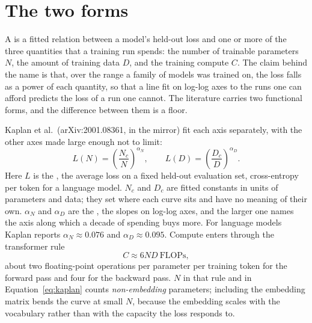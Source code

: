 
\section{The two forms}
\label{sec:forms}

A  is a fitted relation between a model's held-out loss and one
or more of the three quantities that a training run spends: the number of trainable
parameters $N$, the amount of training data $D$, and the training compute $C$. The
claim behind the name is that, over the range a family of models was trained on,
the loss falls as a power of each quantity, so that a line fit on log-log axes to
the runs one can afford predicts the loss of a run one cannot. The literature
carries two functional forms, and the difference between them is a floor.

Kaplan et al.\ (arXiv:2001.08361, in the mirror) fit each axis separately, with the other axes made large enough not to limit:
\begin{equation}
  L(N) = \left(\frac{N_c}{N}\right)^{\alpha_N}, \qquad
  L(D) = \left(\frac{D_c}{D}\right)^{\alpha_D}.
  \label{eq:kaplan}
\end{equation}
Here $L$ is the , the average loss on a fixed held-out evaluation
set, cross-entropy per token for a language model. $N_c$ and $D_c$ are fitted
constants in units of parameters and data; they set where each curve sits and have
no meaning of their own. $\alpha_N$ and $\alpha_D$ are the ,
the slopes on log-log axes, and the larger one names the axis along which a decade
of spending buys more. For language models Kaplan reports $\alpha_N \approx 0.076$
and $\alpha_D \approx 0.095$. Compute enters through the transformer rule
\begin{equation}
  C \approx 6 N D \ \text{FLOPs},
  \label{eq:sixnd}
\end{equation}
about two floating-point operations per parameter per training token for the
forward pass and four for the backward pass. $N$ in that rule and in
Equation~\ref{eq:kaplan} counts \emph{non-embedding} parameters; including the
embedding matrix bends the curve at small $N$, because the embedding scales with the
vocabulary rather than with the capacity the loss responds to.

